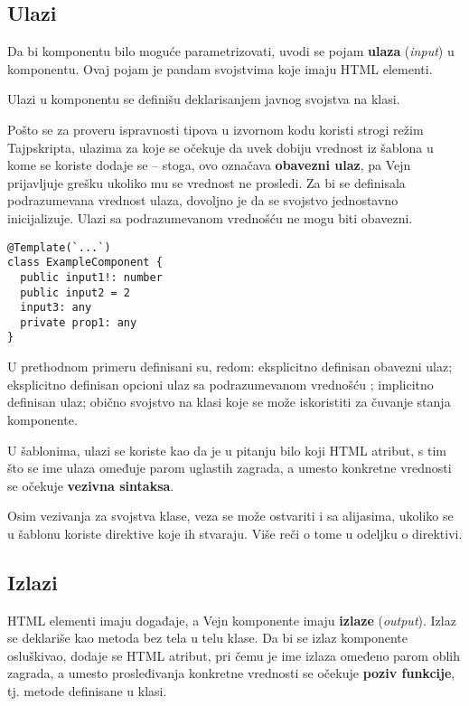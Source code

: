 \subsection{Ulazi}

Da bi komponentu bilo moguće parametrizovati, uvodi se pojam  \textbf{ulaza} (\textsl{input}) u komponentu.
Ovaj pojam je pandam svojstvima koje imaju HTML elementi.

Ulazi u komponentu se definišu deklarisanjem javnog svojstva na klasi.

Pošto se za proveru ispravnosti tipova u izvornom kodu koristi strogi režim Tajpskripta, ulazima za koje se očekuje da uvek dobiju vrednost iz šablona u kome se koriste dodaje se \code{!} -- stoga, ovo označava \textbf{obavezni ulaz}, pa Vejn prijavljuje grešku ukoliko mu se vrednost ne prosledi.
Za bi se definisala podrazumevana vrednost ulaza, dovoljno je da se svojstvo jednostavno inicijalizuje.
Ulazi sa podrazumevanom vrednošću ne mogu biti obavezni.

\begin{verbatim}
@Template(`...`)
class ExampleComponent {
  public input1!: number
  public input2 = 2
  input3: any
  private prop1: any
}
\end{verbatim}

U prethodnom primeru definisani su, redom: eksplicitno definisan obavezni ulaz; eksplicitno definisan opcioni ulaz sa podrazumevanom vrednošću ; implicitno definisan ulaz; obično svojstvo na klasi koje se može iskoristiti za čuvanje stanja komponente.

U šablonima, ulazi se koriste kao da je u pitanju bilo koji HTML atribut, s tim što se ime ulaza omeđuje parom uglastih zagrada, a umesto konkretne vrednosti se očekuje \textbf{vezivna sintaksa}.

Osim vezivanja za svojstva klase, veza se može ostvariti i sa alijasima, ukoliko se u šablonu koriste direktive koje ih stvaraju.
Više reči o tome u odeljku o  direktivi.

\subsection{Izlazi}

HTML elementi imaju događaje, a Vejn komponente imaju \textbf{izlaze} (\textsl{output}).
Izlaz se deklariše kao metoda bez tela u telu klase.
Da bi se izlaz komponente osluškivao, dodaje se HTML atribut, pri čemu je ime izlaza omeđeno parom oblih zagrada, a umesto prosleđivanja konkretne vrednosti se očekuje \textbf{poziv funkcije}, tj. metode definisane u klasi.

